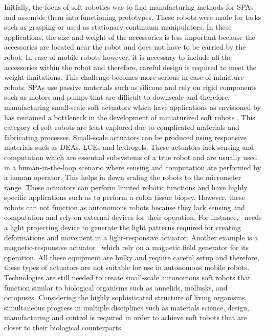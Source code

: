 Initially, the focus of soft robotics was to find manufacturing methods for SPAs and assemble them into functioning prototypes. These robots were made for tasks such as grasping or used as stationary continuum manipulators. In these applications, the size and weight of the accessories is less important because the accessories are located near the robot and does not have to be carried by the robot. In case of mobile robots however, it is necessary to include all the accessories within the robot and therefore, careful design is required to meet the weight limitations. This challenge becomes more serious in case of miniature robots. SPAs use passive materials such as silicone and rely on rigid components such as motors and pumps that are difficult to downscale and therefore, manufacturing small-scale soft actuators which have applications as envisioned by \cite{Hines2017} has remained a bottleneck in the development of miniaturized soft robots \cite{Majidi2019}. This category of soft robots are least explored due to complicated materials and fabricating processes. Small-scale actuators can be produced using responsive materials such as DEAs, LCEs and hydrogels. These actuators lack sensing and computation which are essential subsystems of a true robot and are usually used in a human-in-the-loop scenario where sensing and computation are performed by a human operator. This helps in down scaling the robots to the micrometer range. These actuators can perform limited robotic functions and have highly specific applications such as to perform a colon tissue biopsy. However, these robots can not function as autonomous robots because they lack sensing and computation and rely on external devices for their operation. For instance,~\cite{Palagi2016} needs a light projecting device to generate the light patterns required for creating deformations and movement in a light-responsive actuator. Another example is a magnetic-responsive actuator~\cite{Kim2018} which rely on a magnetic field generator for its operation. All these equipment are bulky and require careful setup and therefore, these types of actuators are not suitable for use in autonomous mobile robots. Technologies are still needed to create small-scale autonomous soft robots that function similar to biological organisms such as annelids, mollusks, and octopuses. Considering the highly sophisticated structure of living organisms, simultaneous progress in multiple disciplines such as materials science, design, manufacturing and control is required in order to achieve soft robots that are closer to their biological counterparts.

